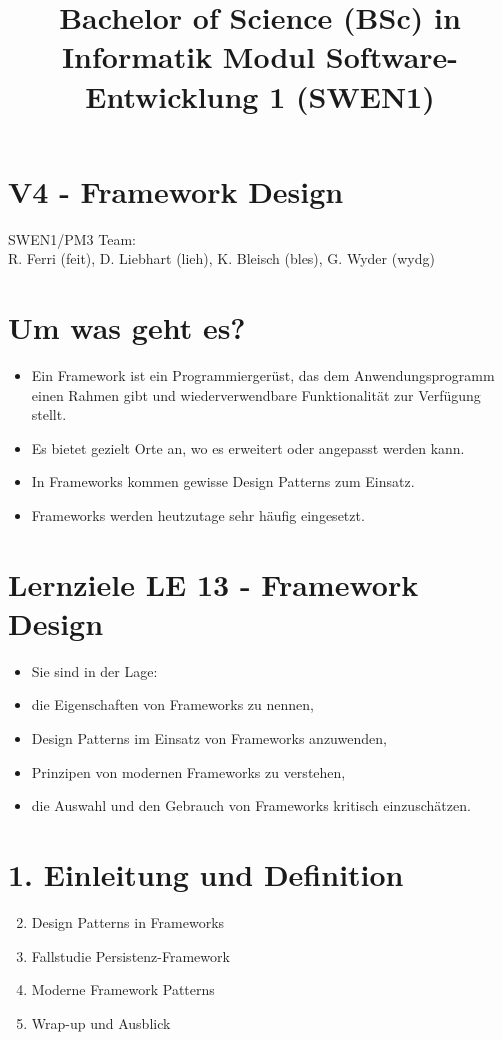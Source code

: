 \documentclass[10pt]{article}
\title{Bachelor of Science (BSc) in Informatik Modul Software-Entwicklung 1 (SWEN1) }
\author{}
\date{}
\begin{document}
\maketitle
\section*{V4 - Framework Design}
SWEN1/PM3 Team:\\
R. Ferri (feit), D. Liebhart (lieh), K. Bleisch (bles), G. Wyder (wydg)

\section*{Um was geht es?}
\begin{itemize}
  \item Ein Framework ist ein Programmiergerüst, das dem Anwendungsprogramm einen Rahmen gibt und wiederverwendbare Funktionalität zur Verfügung stellt.
  \item Es bietet gezielt Orte an, wo es erweitert oder angepasst werden kann.
  \item In Frameworks kommen gewisse Design Patterns zum Einsatz.
  \item Frameworks werden heutzutage sehr häufig eingesetzt.
\end{itemize}

\section*{Lernziele LE 13 - Framework Design}
\begin{itemize}
  \item Sie sind in der Lage:
  \item die Eigenschaften von Frameworks zu nennen,
  \item Design Patterns im Einsatz von Frameworks anzuwenden,
  \item Prinzipen von modernen Frameworks zu verstehen,
  \item die Auswahl und den Gebrauch von Frameworks kritisch einzuschätzen.
\end{itemize}

\section*{1. Einleitung und Definition}
\begin{enumerate}
  \setcounter{enumi}{1}
  \item Design Patterns in Frameworks
  \item Fallstudie Persistenz-Framework
  \item Moderne Framework Patterns
  \item Wrap-up und Ausblick
\end{enumerate}
\end{document}
